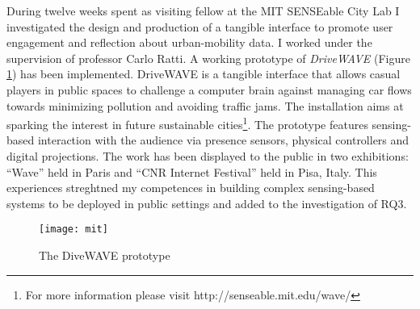 During twelve weeks spent as visiting fellow at the MIT SENSEable City Lab I investigated the design and production of a tangible interface to promote user engagement and reflection about urban-mobility data. I worked under the supervision of professor Carlo Ratti. A working prototype of \emph{DriveWAVE} (Figure \ref{fig:drivewave}) has been implemented. DriveWAVE is a tangible interface that allows casual players in public spaces to challenge a computer brain against managing car flows towards minimizing pollution and avoiding traffic jams. The installation aims at sparking the interest in future sustainable cities\footnote{For more information please visit http://senseable.mit.edu/wave/}. The prototype features sensing-based interaction with the audience via presence sensors, physical controllers and digital projections. The work has been displayed to the public in two exhibitions: ``Wave'' held in Paris and ``CNR Internet Festival'' held in Pisa, Italy. This experiences streghtned my competences in building complex sensing-based systems to be deployed in public settings and added to the investigation of RQ3.
\begin{figure}
	[h] \centering 
	\texttt{[image: mit]} \caption{The DiveWAVE prototype} \label{fig:drivewave} 
\end{figure}